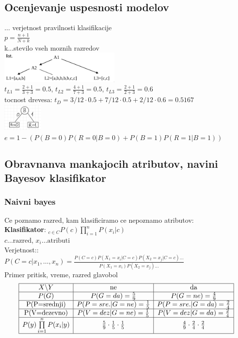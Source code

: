 \subsection{Ocenjevanje uspesnosti modelov}
 $\dots$ verjetnost pravilnosti klasifikacije\\
 $p=\frac{n+1}{N+k}$\\
k...stevilo vseh moznih razredov\\
\includegraphics[width=6cm]{./images/drevo-laplace.png}\\
$t_{L1}=\frac{2+1}{3+3}=0.5$,
$t_{L2}=\frac{4+1}{7+3}=0.5$,
$t_{L3}=\frac{2+1}{2+3}=0.6$\\
tocnost drevesa: $t_D=3/12\cdot 0.5 + 7/12\cdot 0.5 + 2/12\cdot 0.6=0.5167$\\
\includegraphics[width=2cm]{./images/klasifikacijska-napaka.png}\\
$e=1-(P(B=0)P(R=0|B=0)+P(B=1)P(R=1|B=1))$

\subsection{Obravnanva mankajocih atributov, navini Bayesov klasifikator}
\subsubsection{Naivni bayes}
Ce poznamo razred, kam klasificiramo ce nepoznamo atributov:\\
\textbf{Klasifikator}: $_{c\in C} P(c)\prod\limits_{i=1}^n P(x_i|c)$\\
$c\dots \text{razred}$, $x_i\dots \text{atributi}$\\
Verjetnost::\\
$P(C=c|x_1,\dots,x_n)=\frac{P(C=c)P(X_1=x_i|C=c)P(X_2=x_j|C=c)\dots}{P(X_1=x_i)P(X_2=x_j)\dots}$\\


Primer pritisk, vreme, razred glavobol
$$
\begin{array}{|c|c|c|}
    \hline
    X\backslash Y   & \text{ne}      & \text{da}\\
    \hline
    P(G)           & P(G=da) = \frac{5}{9}    & P(G=ne) = \frac{4}{9}\\
    \hline
    \text{P(P=srednji)}   & P(P=sre.|G=ne)=\frac{1}{5} & P(P=sre.|G=da)=\frac{2}{4}\\
    \hline
    \text{P(V=dezevno)} & P(V=dez|G=ne)=\frac{1}{5} & P(V=dez|G=da)=\frac{2}{4}\\
    \hline
    P(y)\prod\limits_{i=1}^n P(x_i|y) & \frac{5}{9}\cdot\frac{1}{5}\cdot\frac{1}{5} & \frac{4}{9}\cdot\frac{2}{4}\cdot\frac{2}{4}\\
    \hline
\end{array}
$$

